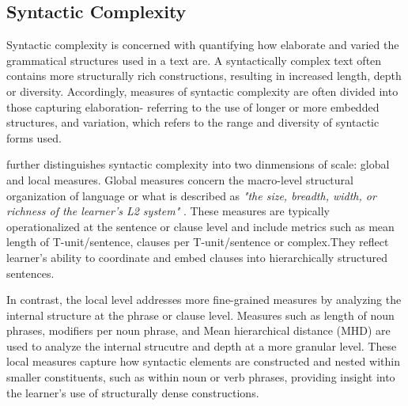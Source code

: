 
\subsection{Syntactic Complexity}


Syntactic complexity  is concerned with quantifying how elaborate and varied the grammatical structures used in a
    text are. A syntactically complex text often contains more structurally rich constructions, resulting in increased length, depth or diversity. Accordingly, measures of syntactic complexity are often divided into those capturing elaboration- referring to the use of
    longer or more embedded structures, and variation, which refers to the range and diversity of syntactic forms
    used.

\citet{Butle2012} further distinguishes syntactic complexity into two dinmensions of scale: global and local
measures. Global
measures concern the macro-level structural organization of language or what is described as
\textit{"the size, breadth, width, or richness of the
learner's L2 system"} \cite{Butle2012}. These measures are typically operationalized at the sentence or clause level
and include metrics such as mean length of T-unit/sentence, clauses per T-unit/sentence or complex.They reflect
learner's ability to coordinate and embed clauses into hierarchically structured sentences.

In contrast, the local level addresses more fine-grained measures by analyzing
the internal structure at the phrase or clause level. Measures such as length of noun phrases,
modifiers per noun phrase, and Mean hierarchical distance (MHD) are used to analyze the internal strucutre and depth
at a more granular level. These local measures capture how syntactic elements are constructed and nested within
smaller constituents, such as within noun or verb phrases, providing insight into the learner's use of structurally
dense constructions.


